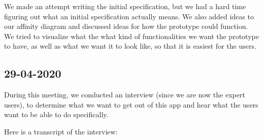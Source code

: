 \documentclass{article}
\begin{document}
We made an attempt writing the initial specification, but we had a hard time figuring out what an initial specification actually means. We also added ideas to our affinity diagram and discussed ideas for how the prototype could function. We tried to visualize what the what kind of functionalities we want the prototype to have, as well as what we want it to look like, so that it is easiest for the users.

\subsection*{29-04-2020}
During this meeting, we conducted an interview (since we are now the expert users), to determine what we want to get out of this app and hear what the users want to be able to do specifically.

Here is a transcript of the interview:
\end{document}
